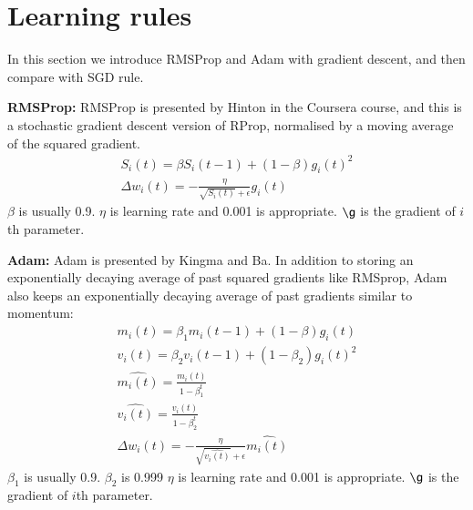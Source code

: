 \documentclass{article}
\begin{document}

\section{Learning rules}
In this section we introduce RMSProp and Adam with gradient descent, and then compare with SGD rule.

{\bf RMSProp:}
RMSProp is presented by Hinton in the Coursera course, and this is a stochastic gradient descent version of RProp, normalised by a moving average of the squared gradient.
\begin{equation}
    \begin{align}
        S_i(t) = \beta S_i(t-1) + (1 - \beta) g_i(t)^2  \\
        \Delta w_i(t) = -\frac{\eta}{\sqrt{S_i(t)}+ \epsilon}g_i(t)
    \end{align}
\end{equation}
$\beta$ is usually 0.9. $\eta$ is learning rate and 0.001 is appropriate. $\g$ is the gradient of $i$th parameter.


{\bf Adam:}
Adam is presented by Kingma and Ba. In addition to storing an exponentially decaying average of past squared gradients like RMSprop, Adam also keeps an exponentially decaying average of past gradients similar to momentum:
\begin{equation}
    \begin{align}
        m_i(t) = \beta_1 m_i(t-1) + (1-\beta)g_i(t) \\
        v_i(t) = \beta_2 v_i(t-1) + (1-\beta_2)g_i(t)^2 \\
        \hat{m_i(t)} = \frac{m_i(t)}{1 - \beta_1 ^ t} \\
        \hat{v_i(t)} = \frac{v_i(t)}{1-\beta_2^t} \\
        \Delta w_i(t) = -\frac{\eta}{\sqrt{\hat{v_i(t)}}+ \epsilon}\hat{m_i(t)}
  \end{align}
 \end{equation}
$\beta_1$ is usually 0.9. $\beta_2$ is 0.999 $\eta$ is learning rate and 0.001 is appropriate. $\g$ is the gradient of $i$th parameter.
\end{document}
